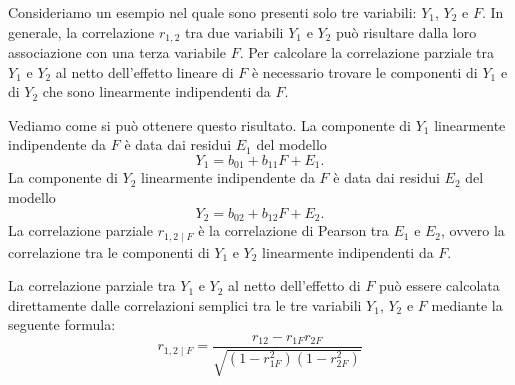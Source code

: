 Consideriamo un esempio nel quale sono presenti solo tre variabili: $Y_1$, $Y_2$ e $F$. 
In generale, la correlazione $r_{1,2}$ tra due variabili $Y_1$ e $Y_2$ può risultare dalla loro associazione con una terza variabile $F$. 
Per calcolare la correlazione parziale tra $Y_1$ e $Y_2$ al netto dell'effetto lineare di $F$ è necessario trovare le componenti di $Y_1$ e di $Y_2$ che sono linearmente indipendenti da $F$. 

Vediamo come si può ottenere questo risultato.
La componente di $Y_1$ linearmente indipendente da $F$ è data dai residui $E_1$ del modello
\[
Y_1 = b_{01} + b_{11}F + E_1.
\]
La componente di $Y_2$ linearmente indipendente da $F$ è data dai residui $E_2$ del modello
\[
Y_2 = b_{02} + b_{12}F + E_2.
\]
La correlazione parziale $r_{1,2 \mid F}$ è la correlazione di Pearson tra $E_1$ e $E_2$, ovvero la correlazione tra le componenti di $Y_1$ e $Y_2$ linearmente indipendenti da $F$.

La correlazione parziale tra $Y_1$ e $Y_2$ al netto dell'effetto di $F$ può essere calcolata direttamente dalle correlazioni semplici tra le tre variabili $Y_1$, $Y_2$ e $F$ mediante la seguente formula:
\begin{equation}
  r_{1,2 \mid F} = \frac{r_{12} - r_{1F}r_{2F}}
  {\sqrt{(1-r_{1F}^2)(1-r_{2F}^2)}} 
\label{eq:corr_parz}
\end{equation}

\bigskip

